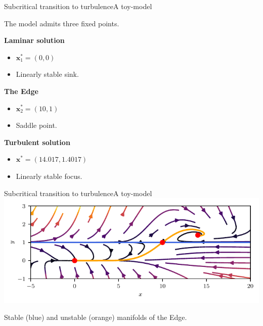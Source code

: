 \documentclass[usenames,dvipsnames,svgnames,10pt,aspectratio=169]{beamer}
\begin{document}
\begin{frame}[t, c]{Subcritical transition to turbulence}{A toy-model}
	\centering

	The model admits three fixed points.

	\bigskip

	\begin{minipage}{.3\textwidth}
		\begin{block}{\centering \textbf{Laminar solution}}
		\end{block}
		\begin{itemize}
			\item ${\bm x}^*_1 = (0, 0)$
			\item Linearly stable sink.
		\end{itemize}
	\end{minipage}%
	\hfill
	\begin{minipage}{.3\textwidth}
		\begin{block}{\centering \textbf{The Edge}}
		\end{block}
		\begin{itemize}
			\item ${\bm x}^*_2 = (10, 1)$
			\item Saddle point.
		\end{itemize}
	\end{minipage}%
	\hfill
	\begin{minipage}{.3\textwidth}
		\begin{block}{\centering \textbf{Turbulent solution}}
		\end{block}
		\begin{itemize}
			\item ${\bm x}^* = (14.017, 1.4017)$
			\item Linearly stable focus.
		\end{itemize}
	\end{minipage}

	\vspace{1cm}
\end{frame}

\begin{frame}[t, c]{Subcritical transition to turbulence}{A toy-model}
	\centering
	\includegraphics[width=.75\textwidth]{kerswell_phase_plane_bis}

	Stable (blue) and unstable (orange) manifolds of the Edge.

	\vspace{1cm}
\end{frame}
\end{document}
